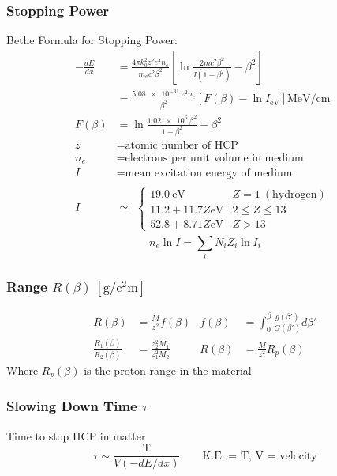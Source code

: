 \subsubsection{Stopping Power}
Bethe Formula for Stopping Power:
\begin{align*}
- \frac{dE}{dx} & = \frac{4 \pi k^2_0 z^2 e^4 n_e}{m_e c^2 \beta^2} \left[ \ln{\frac{2 m c^2 \beta^2}{I (1 - \beta^2)}} - \beta^2 \right] \\
 & = \frac{\SI{5.08e-31}{} z^2 n_e}{\beta^2} \left[ F \left( \beta \right) - \ln{I_\text{eV}}  \right] \si{\mega\eV\per\centi\meter} \\
 F \left( \beta \right) & = \ln{\frac{\SI{1.02e6}{} \beta^2}{1-\beta^2} - \beta^2} \\
z & = \text{atomic number of HCP} \\
n_e & = \text{electrons per unit volume in medium} \\
I & = \text{mean excitation energy of medium} \\
I & \simeq
\begin{array}{lr}
\begin{cases}
\SI{19.0}{\eV}         & Z = 1~(\text{hydrogen}) \\
11.2 + 11.7 Z \si{\eV} & 2 \leq Z \leq 13 \\
52.8 + 8.71 Z \si{\eV} & Z > 13
\end{cases}
\end{array}
\end{align*}
\[
n_e \ln{I} = \sum_i N_i Z_i \ln{I_i}
\]

\subsubsection{Range $R(\beta)~[\si{\gram\per\square\centi\meter}]$}
\begin{align*}
R (\beta) & = \frac{M}{z^2} f(\beta) &  f(\beta) & = \int_0^\beta \frac{g(\beta')}{G(\beta')} d\beta' \\
\frac{R_1 (\beta)}{R_2 (\beta)} & = \frac{z_2^2 M_1}{z_1^2 M_2} & R(\beta) & = \frac{M}{z^2} R_p (\beta)
\end{align*}
Where $R_p (\beta)$ is the proton range in the material

\subsubsection{Slowing Down Time $\tau$}
Time to stop HCP in matter
\[
\tau \sim \frac{\text{T}}{V (-dE / dx)} \qquad \text{K.E. = T, V = velocity}
\]

